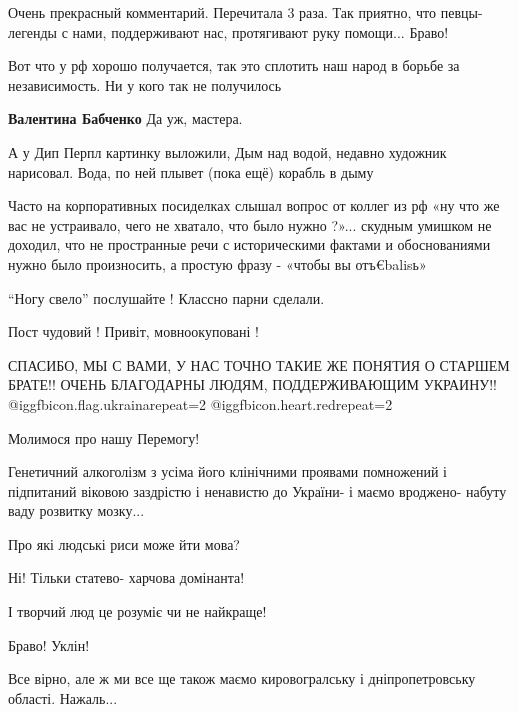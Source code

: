 \begin{itemize}

Очень прекрасный комментарий. Перечитала 3 раза. Так приятно, что певцы-легенды
с нами, поддерживают нас, протягивают руку помощи... Браво!


Вот что у рф хорошо получается, так это сплотить наш народ в борьбе за
независимость. Ни у кого так не получилось

\textbf{Валентина Бабченко}
Да уж, мастера.


А у Дип Перпл картинку выложили, Дым над водой, недавно художник нарисовал.
Вода, по ней плывет (пока ещё) корабль в дыму


Часто на корпоративных посиделках слышал вопрос от коллег из рф «ну что же вас
не устраивало, чего не хватало, что было нужно ?»... скудным умишком не доходил,
что не пространные речи с историческими фактами и обоснованиями нужно было
произносить, а простую фразу - «чтобы вы отъ€balisь»

\enquote{Ногу свело} послушайте !
Классно парни сделали.

Пост чудовий ! Привіт, мовноокуповані !


СПАСИБО, МЫ С ВАМИ, У НАС ТОЧНО ТАКИЕ ЖЕ ПОНЯТИЯ О СТАРШЕМ БРАТЕ!! ОЧЕНЬ
БЛАГОДАРНЫ ЛЮДЯМ, ПОДДЕРЖИВАЮЩИМ УКРАИНУ!! @igg{fbicon.flag.ukraina}{repeat=2} @igg{fbicon.heart.red}{repeat=2}

Молимося про нашу Перемогу!


Генетичний алкоголізм з усіма його клінічними проявами помножений і підпитаний
віковою заздрістю і ненавистю до України- і маємо вроджено- набуту ваду
розвитку мозку...

Про які людські риси може йти мова?

Ні! Тільки статево- харчова домінанта!

І творчий люд це розуміє чи не найкраще!

Браво! Уклін!


Все вірно, але ж ми все ще також маємо кировогралську і дніпропетровську області. Нажаль...



\end{itemize}
